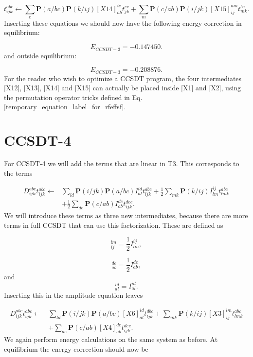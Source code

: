 \documentclass[a4paper,norsk,11pt,twoside]{report}
\begin{document}
\begin{equation}
t_{ijk}^{abc} \leftarrow
\sum_e \textbf{P}(a/bc) \textbf{P}(k/ij)
[X14]_{ab}^{ie} t_{jk}^{ec}
+ \sum_m \textbf{P}(c/ab) \textbf{P}(i/jk)
[X15]_{ij}^{am} t_{mk}^{bc} .
\end{equation}
Inserting these equations we should now have the following energy correction in equilibrium:

\begin{equation}
E_{CCSDT-3} = -0.147450 .
\end{equation}
and outside equilibrium:

\begin{equation}
E_{CCSDT-3} = -0.208876 .
\end{equation}
For the reader who wish to optimize a CCSDT program, the four intermediates [X12], [X13], [X14] and [X15] can actually be placed inside [X1] and [X2], using the permutation operator tricks defined in Eq. \eqref{temporary_equation_label_for_rfeffsf}. \\

\section{CCSDT-4}
For CCSDT-4 we will add the terms that are linear in T3. This corresponds to the terms

\begin{align}
D_{ijk}^{abc} t_{ijk}^{abc} \leftarrow &
\sum _{ld}
\textbf{P}(i/jk) \textbf{P}(a/bc) 
I_{al}^{id} t^{dbc}_{ljk}
+
\frac{1}{2} \sum_{mk}
\textbf{P}(k/ij) I_{lm}^{ij} t_{lmk}^{abc}
\nonumber \\ &
+
\frac{1}{2} \sum_{de} 
\textbf{P}(c/ab) I_{ab}^{de} t^{dec}_{ijk} .
\end{align}
We will introduce these terms as three new intermediates, because there are more terms in full CCSDT that can use this factorization. These are defined as

\begin{equation}
[X3]_{ij}^{lm} = \frac{1}{2} I_{lm}^{ij} ,
\end{equation}

\begin{equation}
[X4]_{ab}^{de} = \frac{1}{2} I_{ab}^{de} ,
\end{equation}
and
\begin{equation}
[X6]_{al}^{id} = I_{al}^{id} .
\end{equation}
Inserting this in the amplitude equation leaves

\begin{align}
D_{ijk}^{abc} t_{ijk}^{abc} \leftarrow &
\sum _{ld}
\textbf{P}(i/jk) \textbf{P}(a/bc) 
[X6]_{al}^{id} t^{dbc}_{ljk}
+
 \sum_{mk}
\textbf{P}(k/ij) [X3]_{ij}^{lm} t_{lmk}^{abc}
\nonumber \\ &
+
\sum_{de}
\textbf{P}(c/ab)[X4]_{ab}^{de}  t^{dec}_{ijk} .
\end{align}
We again perform energy calculations on the same system as before. At equilibrium the energy correction should now be
\end{document}
